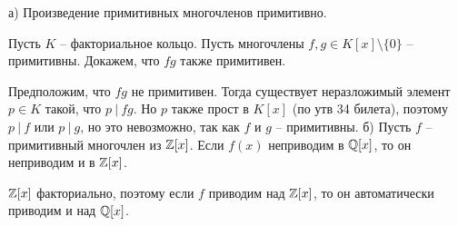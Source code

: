 а) Произведение примитивных многочленов примитивно.

Пусть $K$ -- факториальное кольцо.
Пусть многочлены $f, g \in K[x] \setminus \{0\}$ -- примитивны. 
Докажем, что $fg$ также примитивен.

Предположим, что $fg$ не примитивен. Тогда существует неразложимый элемент
$p \in K$ такой, что $p\ |\ fg$. Но $p$ также прост в $K[x]$ (по утв 34 билета), поэтому
$p\ |\ f$ или $p\ |\ g$, но это невозможно, так как
$f$ и $g$ -- примитивны.
\bigbreak
б) Пусть $f$ -- примитивный многочлен из $\mathbb{Z}[x]$. 
Если $f(x)$ неприводим в $\mathbb{Q}[x]$, то он неприводим и в $\mathbb{Z}[x]$.

$\mathbb{Z}[x]$ факториально, поэтому если $f$ приводим над $\mathbb{Z}[x]$, то он
автоматически приводим и над $\mathbb{Q}[x]$.
